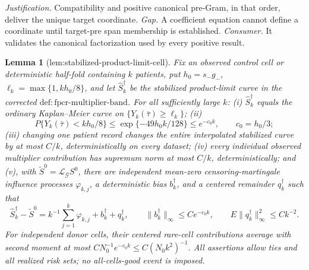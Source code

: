 \documentclass{article}
\newtheorem{lemma}{Lemma}
\begin{document}
\par\smallskip\noindent \textit{Justification.} Compatibility and positive canonical pre-Gram, in that order, deliver the unique target coordinate. \textit{Gap.} A coefficient equation cannot define a coordinate until target-pre span membership is established. \textit{Consumer.} It validates the canonical factorization used by every positive result.

\begin{lemma}[lem:stabilized-product-limit-cell]\label{lem:stabilized-product-limit-cell}
Fix an observed control cell or deterministic half-fold containing \(k\) patients, put \(h_0=s_-g_-\), \(\ell_k=\max\{1,kh_0/8\}\), and let \(\widehat S_k^\dagger\) be the stabilized product-limit curve in the corrected \(\mathrm{def:fpcr\mbox{-}multiplier\mbox{-}band}\). For all sufficiently large \(k\): (i) \(\widehat S_k^\dagger\) equals the ordinary Kaplan--Meier curve on \(\{Y_k(\bar\tau)\ge\ell_k\}\); (ii)
\[
 P\{Y_k(\bar\tau)<kh_0/8\}
 \le \exp\{-49h_0k/128\}\le e^{-c_0k},
 \qquad c_0=h_0/3;
\]
(iii) changing one patient record changes the entire interpolated stabilized curve by at most \(C/k\), deterministically on every dataset; (iv) every individual observed multiplier contribution has supremum norm at most \(C/k\), deterministically; and (v), with \(\widetilde S^0=\mathcal L_{\mathcal G}S^0\), there are independent mean-zero censoring-martingale influence processes \(\varphi_{k,j}\), a deterministic bias \(b_k^\dagger\), and a centered remainder \(q_k^\dagger\) such that
\[
 \widehat S_k^\dagger-\widetilde S^0
 =k^{-1}\sum_{j=1}^k\varphi_{k,j}+b_k^\dagger+q_k^\dagger,
 \qquad
 \|b_k^\dagger\|_\infty\le Ce^{-c_0k},
 \qquad
 E\|q_k^\dagger\|_\infty^2\le Ck^{-2}.
\]
For independent donor cells, their centered rare-cell contributions average with second moment at most \(CN_0^{-1}e^{-c_0k}\le C(N_0k^2)^{-1}\). All assertions allow ties and all realized risk sets; no all-cells-good event is imposed.
\end{lemma}
\end{document}
